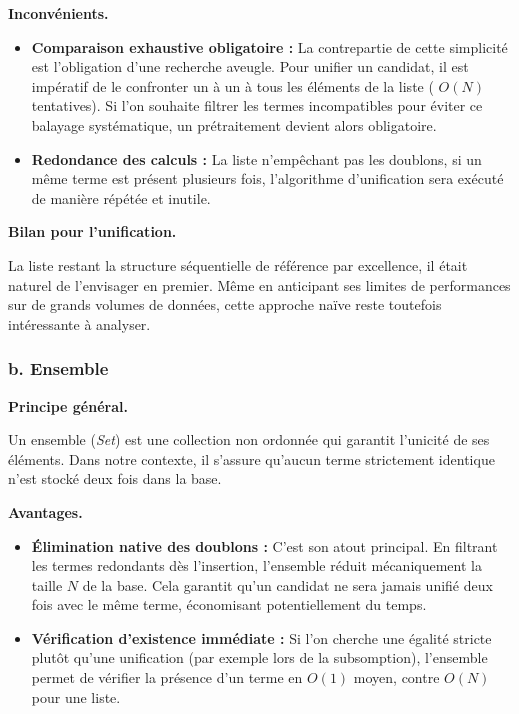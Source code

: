 \documentclass[11pt]{article}
\begin{document}
\vspace{0.4cm}
\noindent\textbf{Inconvénients.}

\begin{itemize}
    \item \textbf{Comparaison exhaustive obligatoire :} La contrepartie de cette simplicité est l'obligation d'une recherche aveugle. Pour unifier un candidat, il est impératif de le confronter un à un à tous les éléments de la liste ( $O(N)$  tentatives). Si l'on souhaite filtrer les termes incompatibles pour éviter ce balayage systématique, un prétraitement devient alors obligatoire.
    \item \textbf{Redondance des calculs :} La liste n'empêchant pas les doublons, si un même terme est présent plusieurs fois, l'algorithme d'unification sera exécuté de manière répétée et inutile.
\end{itemize}

\vspace{0.4cm}
\noindent\textbf{Bilan pour l'unification.}

\vspace{0.2cm}
La liste restant la structure séquentielle de référence par excellence, il était naturel de l’envisager
en premier. Même en anticipant ses limites de performances sur de grands volumes de données, cette
approche naïve reste toutefois intéressante à analyser.

\newpage

\subsubsection*{\hspace{4em}b. Ensemble}
\label{ensemble}

\vspace{0.4cm}

\noindent\textbf{Principe général.}

\vspace{0.2cm}
Un ensemble (\textit{Set}) est une collection non ordonnée qui garantit l'unicité de ses éléments. Dans notre contexte, il s'assure qu'aucun terme strictement identique n'est stocké deux fois dans la base.

\vspace{0.4cm}
\noindent\textbf{Avantages.}

\begin{itemize}
    \item \textbf{Élimination native des doublons :} C'est son atout principal. En filtrant les termes redondants dès l'insertion, l'ensemble réduit mécaniquement la taille $N$ de la base. Cela garantit qu'un candidat ne sera jamais unifié deux fois avec le même terme, économisant potentiellement du temps.
    \item \textbf{Vérification d'existence immédiate :} Si l'on cherche une égalité stricte plutôt qu'une unification (par exemple lors de la subsomption), l'ensemble permet de vérifier la présence d'un terme en $O(1)$ moyen, contre $O(N)$ pour une liste.
\end{itemize}
\end{document}
